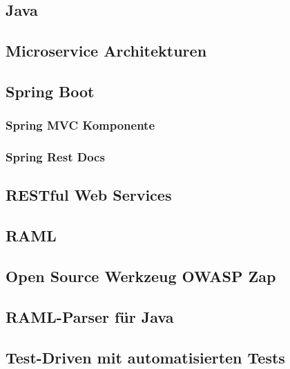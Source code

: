 \subsection{Java}

\subsection{Microservice Architekturen}

\subsection{Spring Boot}

\subsubsection{Spring MVC Komponente}

\subsubsection{Spring Rest Docs}

\subsection{RESTful Web Services}

\subsection{RAML}

\subsection{Open Source Werkzeug OWASP Zap}

\subsection{RAML-Parser für Java}

\subsection{Test-Driven mit automatisierten Tests}

